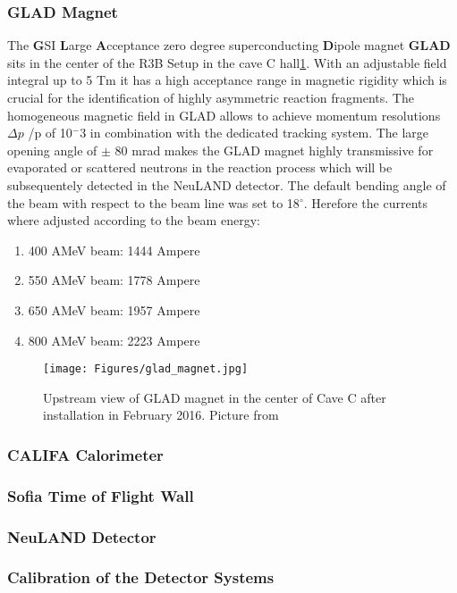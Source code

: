 \subsubsection{GLAD Magnet}
The \textbf{G}SI \textbf{L}arge \textbf{A}cceptance zero degree superconducting \textbf{D}ipole magnet \textbf{GLAD} sits in the center of the R3B Setup in the cave C hall\ref{fig:GLAD}. With an adjustable field integral up to 5 Tm it has a high acceptance range in magnetic rigidity which is crucial for the identification of highly asymmetric reaction fragments. The homogeneous magnetic field in GLAD allows to achieve momentum resolutions $\Delta p$ /p of 10$^-3$ in combination with the dedicated tracking system.\newline
The large opening angle of $\pm$ 80 mrad makes the GLAD magnet highly transmissive for evaporated or scattered neutrons in the reaction process which will be subsequentely detected in the NeuLAND detector.\newline
The default bending angle of the beam with respect to the beam line was set to 18$^{\circ}$. Herefore the currents where adjusted according to the beam energy:\newline
\begin{enumerate}
\item 400 AMeV beam: 1444 Ampere
\item 550 AMeV beam: 1778 Ampere
\item 650 AMeV beam: 1957 Ampere
\item 800 AMeV beam: 2223 Ampere
\end{enumerate}
\begin{figure}[htpb]
    \centering
    \texttt{[image: Figures/glad\_magnet.jpg]}
    \caption{
    Upstream view of GLAD magnet in the center of Cave C after installation in February 2016. Picture from \cite{wiki:GLAD} 
    }
    \label{fig:GLAD}
\end{figure}
\subsubsection{CALIFA Calorimeter}
\subsubsection{Sofia Time of Flight Wall}
\subsubsection{NeuLAND Detector}

\subsubsection{Calibration of the Detector Systems}



